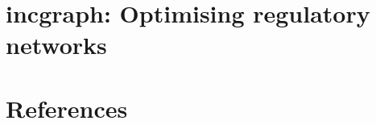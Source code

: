 \section{incgraph: Optimising regulatory networks}



\clearpage
\section{References}
\printbibliography[heading=none]